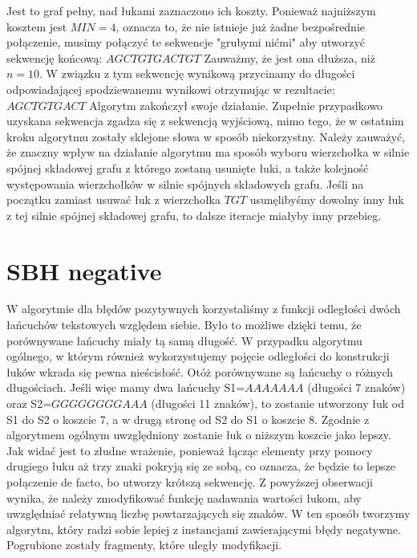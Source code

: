 \documentclass[a4paper,10pt]{article}
\begin{document}
Jest to graf pełny, nad łukami zaznaczono ich koszty. Ponieważ najniższym kosztem jest $MIN=4$, oznacza to, że nie istnieje już żadne bezpośrednie połączenie, musimy połączyć te sekwencje "grubymi nićmi" aby utworzyć sekwencję końcową:
$AGCTGTGACTGT$
Zauważmy, że jest ona dłuższa, niż $n=10$. W związku z tym sekwencję wynikową przycinamy do długości odpowiadającej spodziewanemu wynikowi otrzymując w rezultacie:
$AGCTGTGACT$
Algorytm zakończył swoje działanie. Zupełnie przypadkowo uzyskana sekwencja zgadza się z sekwencją wyjściową, mimo tego, że w ostatnim kroku algorytmu zostały sklejone słowa w sposób niekorzystny.
Należy zauważyć, że znaczny wpływ na działanie algorytmu ma sposób wyboru wierzchołka w silnie spójnej składowej grafu z którego zostaną usunięte łuki, a także kolejność występowania wierzchołków w silnie spójnych składowych grafu. Jeśli na początku zamiast usuwać łuk z wierzchołka $TGT$ usunęlibyśmy dowolny inny łuk z tej silnie spójnej składowej grafu, to dalsze iteracje miałyby inny przebieg.

\section{SBH negative}
W algorytmie dla błędów pozytywnych korzystaliśmy z funkcji odległości dwóch łańcuchów tekstowych względem siebie. Było to możliwe dzięki temu, że porównywane łańcuchy miały tą samą długość. W przypadku algorytmu ogólnego, w którym również wykorzystujemy pojęcie odległości do konstrukcji łuków wkrada się pewna nieścisłość. Otóż porównywane są łańcuchy o różnych długościach. Jeśli więc mamy dwa łańcuchy S1=$AAAAAAA$ (długości 7 znaków) oraz S2=$GGGGGGGGAAA$ (długości 11 znaków), to zostanie utworzony łuk od S1 do S2 o koszcie 7, a w drugą stronę od S2 do S1 o koszcie 8. Zgodnie z algorytmem ogólnym uwzględniony zostanie łuk o niższym koszcie jako lepszy. Jak widać jest to złudne wrażenie, ponieważ łącząc elementy przy pomocy drugiego łuku aż trzy znaki pokryją się ze sobą, co oznacza, że będzie to lepsze połączenie de facto, bo utworzy krótszą sekwencję.
Z powyższej obserwacji wynika, że należy zmodyfikować funkcję nadawania wartości łukom, aby uwzględniać relatywną liczbę powtarzających się znaków. W ten sposób tworzymy algorytm, który radzi sobie lepiej z instancjami zawierającymi błędy negatywne. Pogrubione zostały fragmenty, które uległy modyfikacji.
\end{document}
